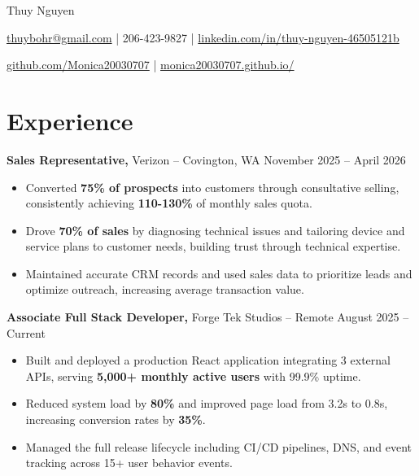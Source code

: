 \documentclass[11pt]{article}
\begin{document}
\centerline{\Huge Thuy Nguyen}

\vspace{5pt}

\centerline{\href{mailto:thuybohr@gmail.com}{thuybohr@gmail.com} | 206-423-9827 |
\href{https://www.linkedin.com/in/thuy-nguyen-46505121b/}{linkedin.com/in/thuy-nguyen-46505121b}}

\centerline{\href{https://github.com/Monica20030707}{github.com/Monica20030707} |
\href{https://monica20030707.github.io/}{monica20030707.github.io/}}

\vspace{-9pt}

\section*{Experience}

\textbf{Sales Representative,} {Verizon} -- Covington, WA \hfill November 2025 -- April 2026
\vspace{-9pt}
\begin{itemize}
  \item Converted \textbf{75\% of prospects} into customers through consultative selling, consistently achieving \textbf{110-130\%} of monthly sales quota.
  \item Drove \textbf{70\% of sales} by diagnosing technical issues and tailoring device and service plans to customer needs, building trust through technical expertise.
  \item Maintained accurate CRM records and used sales data to prioritize leads and optimize outreach, increasing average transaction value.
\end{itemize}

\textbf{Associate Full Stack Developer,} {Forge Tek Studios} -- Remote \hfill August 2025 -- Current
\vspace{-9pt}
\begin{itemize}
  \item Built and deployed a production React application integrating 3 external APIs, serving \textbf{5,000+ monthly active users} with 99.9\% uptime.
  \item Reduced system load by \textbf{80\%} and improved page load from 3.2s to 0.8s, increasing conversion rates by \textbf{35\%}.
  \item Managed the full release lifecycle including CI/CD pipelines, DNS, and event tracking across 15+ user behavior events.
\end{itemize}
\end{document}
